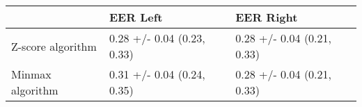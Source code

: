 \begin{tabular}{lll}
\toprule
{} &                    EER Left &                   EER Right \\
\midrule
Z-score algorithm &  0.28 +/- 0.04 (0.23, 0.33) &  0.28 +/- 0.04 (0.21, 0.33) \\
Minmax algorithm  &  0.31 +/- 0.04 (0.24, 0.35) &  0.28 +/- 0.04 (0.21, 0.33) \\
\bottomrule
\end{tabular}
